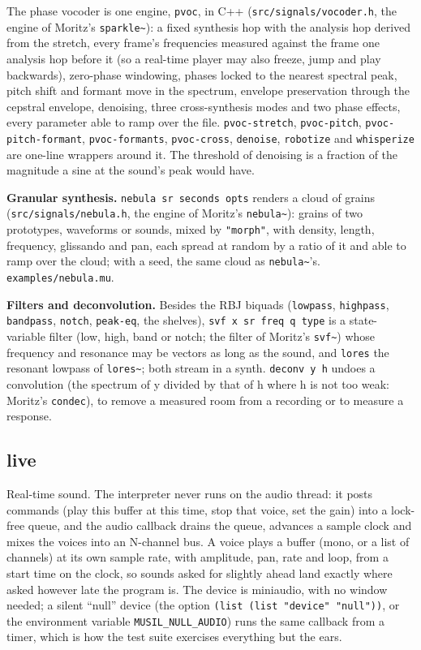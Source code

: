 \documentclass[11pt,a4paper]{article}
\newcommand{\musil}[1]{\lstinline[style=musilinline]{#1}}
\begin{document}
The phase vocoder is one engine, \musil{pvoc}, in C++ (\texttt{src/signals/vocoder.h},
the engine of Moritz's \texttt{sparkle\textasciitilde}): a fixed synthesis hop with the
analysis hop derived from the stretch, every frame's frequencies measured against the
frame one analysis hop before it (so a real-time player may also freeze, jump and play
backwards), zero-phase windowing, phases locked to the nearest spectral peak, pitch shift and formant move in the spectrum, envelope
preservation through the cepstral envelope, denoising, three cross-synthesis modes and
two phase effects, every parameter able to ramp over the file. \musil{pvoc-stretch},
\musil{pvoc-pitch}, \musil{pvoc-pitch-formant}, \musil{pvoc-formants},
\musil{pvoc-cross}, \musil{denoise}, \musil{robotize} and \musil{whisperize} are
one-line wrappers around it. The threshold of denoising is a fraction of the magnitude a
sine at the sound's peak would have.

\textbf{Granular synthesis.} \musil{nebula sr seconds opts} renders a cloud of grains
(\texttt{src/signals/nebula.h}, the engine of Moritz's \texttt{nebula\textasciitilde}):
grains of two prototypes, waveforms or sounds, mixed by \texttt{"morph"}, with density,
length, frequency, glissando and pan, each spread at random by a ratio of it and able to
ramp over the cloud; with a seed, the same cloud as \texttt{nebula\textasciitilde}'s.
\texttt{examples/nebula.mu}.

\textbf{Filters and deconvolution.} Besides the RBJ biquads (\musil{lowpass},
\musil{highpass}, \musil{bandpass}, \musil{notch}, \musil{peak-eq}, the shelves),
\musil{svf x sr freq q type} is a state-variable filter (low, high, band or notch; the
filter of Moritz's \texttt{svf\textasciitilde}) whose frequency and resonance may be vectors
as long as the sound, and \musil{lores} the resonant lowpass of
\texttt{lores\textasciitilde}; both stream in a synth. \musil{deconv y h} undoes a
convolution (the spectrum of y divided by that of h where h is not too weak: Moritz's
\texttt{condec}), to remove a measured room from a recording or to measure a response.



\subsection{live}

Real-time sound. The interpreter never runs on the audio thread: it posts commands
(play this buffer at this time, stop that voice, set the gain) into a lock-free queue,
and the audio callback drains the queue, advances a sample clock and mixes the voices
into an N-channel bus. A voice plays a buffer (mono, or a list of channels) at its own
sample rate, with amplitude, pan, rate and loop, from a start time on the clock, so
sounds asked for slightly ahead land exactly where asked however late the program is.
The device is miniaudio, with no window needed; a silent ``null'' device (the option
\musil{(list (list "device" "null"))}, or the environment variable
\texttt{MUSIL\_NULL\_AUDIO}) runs the same callback from a timer, which is how the test
suite exercises everything but the ears.
\end{document}
